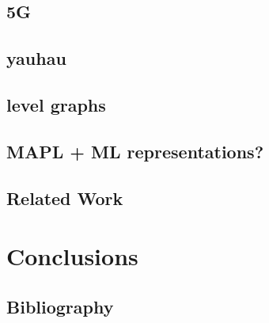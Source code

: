 \documentclass{report}
\begin{document}
\section{5G}
\section{yauhau}
\section{level graphs}
\section{MAPL + ML representations?}

\section{Related Work}

\chapter{Conclusions} 

\section{Bibliography} 
\end{document}
